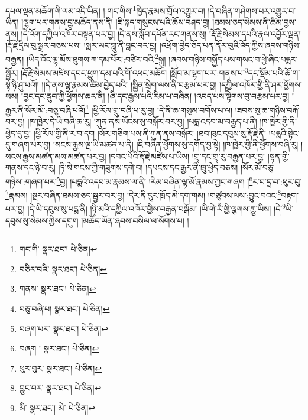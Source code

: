 དཔལ་ལྡན་མཆོག་གི་ལམ་འདི་ཡིན། །:གང་གིས་\footnote{གང་གི་  སྣར་ཐང་།  པེ་ཅིན། }ཁྱེད་རྣམས་གྲོལ་འགྱུར་བ། །དེ་བཞིན་གཤེགས་པར་འགྱུར་བ་ཡིན། །ལྷག་པར་གནས་བྱ་མཆོད་ནས་ནི། །ཇི་སྐད་གསུངས་པའི་ཆོས་བཤད་བྱ། །ཐམས་ཅད་སེམས་ནི་ཚིམ་བྱས་ནས། །དེ་འོག་དཀྱིལ་འཁོར་བསྟན་པར་བྱ། །དེ་ནས་སློབ་དཔོན་རང་གནས་སུ། །རྡོ་རྗེ་སེམས་དཔའི་རྣལ་འབྱོར་ལྡན། །རྡོ་རྗེ་དྲིལ་བུ་སྒྲར་བཅས་པས། །སླར་ཡང་གླུ་ནི་བླང་བར་བྱ། །འཕྲོག་བྱེད་ཅོད་པན་ནོར་བུའི་འོད་ཀྱིས་ཞབས་གཉིས་བརྒྱན། །ཡིད་འོང་ལྷ་མོས་ཐུགས་ཀ་དམ་པོར་:བཙིར་བའི་\footnote{བཅིར་བའི་  སྣར་ཐང་།  པེ་ཅིན། }སྐུ། །ཞབས་གཉིས་བསྐྱོད་པས་གསང་བ་ཕྱེ་ཞིང་པདྨར་སྦྱོར། །རྡོ་རྗེ་སེམས་མཛེས་དབང་ཕྱུག་དམ་པའི་གོ་འཕང་མཆོག །སློབ་མ་ལྷག་པར་:གནས་པ་\footnote{གནས་  སྣར་ཐང་།  པེ་ཅིན། }དང་སྡོམ་པའི་ཆོ་ག་སྟེ་ཉི་ཤུ་པའོ།། །།དེ་ནས་ལྷ་རྣམས་ཚིམ་བྱེད་པའི། །སྦྱིན་སྲེག་ལས་ནི་བརྩམ་པར་བྱ། །དཀྱིལ་འཁོར་གྱི་ནི་ཤར་ཕྱོགས་སམ། །བྱང་དང་ནུབ་ཀྱི་ཕྱོགས་ཆར་ནི། །ཞི་དང་རྒྱས་པའི་རིམ་པ་བཞིན། །འབད་པས་སྟེགས་བུ་བརྩམ་པར་བྱ། །རྒྱར་ནི་སོར་མོ་:བཅུ་བཞི་པའོ།\footnote{བཅུ་བཞི་པ།  སྣར་ཐང་།  པེ་ཅིན། } །ཕྱི་རོལ་གྲུ་བཞི་པ་རུ་བྱ། །དེ་ནི་ཆ་གསུམ་བགོས་པ་ལ། །ཟབས་སུ་ཆ་གཉིས་བརྐོ་བར་བྱ། །ཁ་ཁྱེར་དེ་ཡི་བཞི་ཆ་རུ། །ཀུན་ནས་ཡོངས་སུ་བསྐོར་བར་བྱ། །པདྨ་འདབ་མ་བརྒྱད་པ་ནི། །ཁ་ཁྱེར་གྱི་ནི་ཕྱེད་དུ་བྱ། །ཕྱི་རོལ་གྱི་ནི་ར་བ་དག །སོར་གཅིག་པས་ནི་ཀུན་ནས་བསྐོར། །ཐབ་ཁུང་དབུས་སུ་རྡོ་རྗེ་ནི། །པདྨའི་སྟེང་དུ་གཞག་པར་བྱ། །སངས་རྒྱས་ལྔ་ཡི་མཚན་པ་ནི། །ཇི་བཞིན་ཕྱོགས་སུ་དགོད་བྱ་སྟེ། །ཁ་ཁྱེར་གྱི་ནི་ཕྱོགས་བཞི་རུ། །སངས་རྒྱས་མཚན་མས་མཚན་པར་བྱ། །དབང་པོའི་རྡོ་རྗེ་མཛེས་པ་ཡིས། །གྲྭ་དང་གྲྭ་རུ་བརྒྱན་པར་བྱ། །སྟན་གྱི་གནས་དང་ཉེ་བ་རུ། །ཏི་སེ་གངས་ཀྱི་གཟུགས་དགེ་བ། །དཔངས་དང་རྒྱར་ནི་ཁྲུ་ཕྱེད་བཅས། །སོར་མོ་བཅུ་གཉིས་:གཞག་པར་\footnote{བཞག་པར་  སྣར་ཐང་།  པེ་ཅིན། }བྱ། །པདྨའི་འདབ་མ་རྣམས་ལ་ནི། །རིམ་བཞིན་ལྷ་མོ་རྣམས་ཀྱང་གཞག །\footnote{བཞག །  སྣར་ཐང་།  པེ་ཅིན། }ར་བ་དྲ་བ་:ཕུར་བུ་\footnote{ཕུར་བུར་  སྣར་ཐང་།  པེ་ཅིན། }རྣམས། །སྔར་བཞིན་ཐམས་ཅད་སྦྱར་བར་བྱ། །དེར་ནི་དུར་ཁྲོད་མེ་དག་གམ། །གཙུབས་ལས་:བྱུང་བའང་\footnote{བྱུང་བར་  སྣར་ཐང་།  པེ་ཅིན། }བརྟག་པར་བྱ། །དེ་ཡི་དབུས་སུ་པདྨ་ནི། །ཉི་མའི་དཀྱིལ་འཁོར་གྱིས་བརྒྱན་བསྒོམ། །ཡི་གེ་རྃ་གྱི་ལྕགས་ཀྱུ་ཡིས། །དེ་\footnote{མི་  སྣར་ཐང་། མེ་  པེ་ཅིན། }ཡི་དབུས་སུ་སེམས་ཀྱིས་དགུག །མཆོད་ཡོན་ཞབས་བསིལ་ལ་སོགས་པ། །

